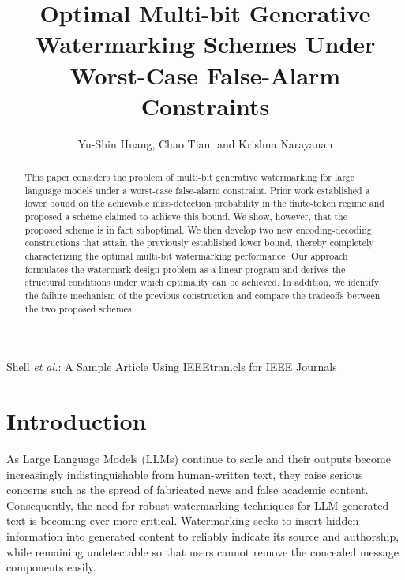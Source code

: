 \documentclass[11pt,letterpaper]{article}
\begin{document}
\title{Optimal Multi-bit Generative Watermarking Schemes Under Worst-Case False-Alarm Constraints}

\author{Yu-Shin Huang, Chao Tian, and Krishna Narayanan}

%
{Shell \MakeLowercase{\textit{et al.}}: A Sample Article Using IEEEtran.cls for IEEE Journals}


\maketitle

\begin{abstract}
This paper considers the problem of multi-bit generative watermarking for large language models under a worst-case false-alarm constraint. Prior work established a lower bound on the achievable miss-detection probability in the finite-token regime and proposed a scheme claimed to achieve this bound. We show, however, that the proposed scheme is in fact suboptimal. We then develop two new encoding-decoding constructions that attain the previously established lower bound, thereby completely characterizing the optimal multi-bit watermarking performance. Our approach formulates the watermark design problem as a linear program and derives the structural conditions under which optimality can be achieved. In addition, we identify the failure mechanism of the previous construction and compare the tradeoffs between the two proposed schemes.
\end{abstract}



\section{Introduction}

As Large Language Models (LLMs) continue to scale and their outputs become increasingly indistinguishable from human-written text, they raise serious concerns such as the spread of fabricated news and false academic content. Consequently, the need for robust watermarking techniques \cite{cox2008digital} for LLM-generated text is becoming ever more critical. Watermarking seeks to insert hidden information into generated content to reliably indicate its source and authorship, while remaining undetectable so that users cannot remove the concealed message components easily.
\end{document}
